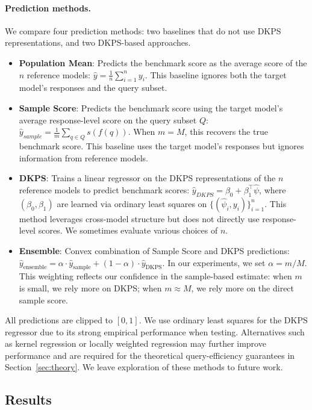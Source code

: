 \paragraph{Prediction methods.}
We compare four prediction methods: two baselines that do not use DKPS representations, and two DKPS-based approaches.
\begin{itemize}[itemsep=1pt, topsep=3pt]
\item \textbf{Population Mean}: Predicts the benchmark score as the average score of the $n$ reference models: $\hat{y} = \frac{1}{n}\sum_{i=1}^n y_i$. 
This baseline ignores both the target model's responses and the query subset.
\item \textbf{Sample Score}: Predicts the benchmark score using the target model's average response-level score on the query subset $Q$: $\hat{y}_{sample} = \frac{1}{m}\sum_{q \in Q} s(f(q))$. When $m = M$, this recovers the true benchmark score. 
This baseline uses the target model's responses but ignores information from reference models.
\item \textbf{DKPS}: Trains a linear regressor on the DKPS representations of the $n$ reference models to predict benchmark scores: $\hat{y}_{DKPS} = \beta_0 + \beta_{1}^\top \widehat{\psi}$, where $(\beta_0, \beta_{1})$ are learned via ordinary least squares on $\{(\widehat{\psi}_i, y_i)\}_{i=1}^n$. 
This method leverages cross-model structure but does not directly use response-level scores.
We sometimes evaluate various choices of $ n $.
\item \textbf{Ensemble}: Convex combination of Sample Score and DKPS predictions: 
$\hat{y}_{\text{ensemble}} = \alpha \cdot \hat{y}_{\text{sample}} + (1-\alpha) \cdot\hat{y}_{\text{DKPS}}.$
In our experiments, we set $ \alpha = m / M $.
This weighting reflects our confidence in the sample-based estimate: when $m$ is small, we rely more on DKPS; when $m \approx M$, we rely more on the direct sample score.
\end{itemize}
All predictions are clipped to $[0,1]$.
We use ordinary least squares for the DKPS regressor due to its strong empirical performance when testing.
Alternatives such as kernel regression or locally weighted regression may further improve performance and are required for the theoretical query-efficiency guarantees in Section~\ref{sec:theory}.
We leave exploration of these methods to future work.

\subsection{Results}
